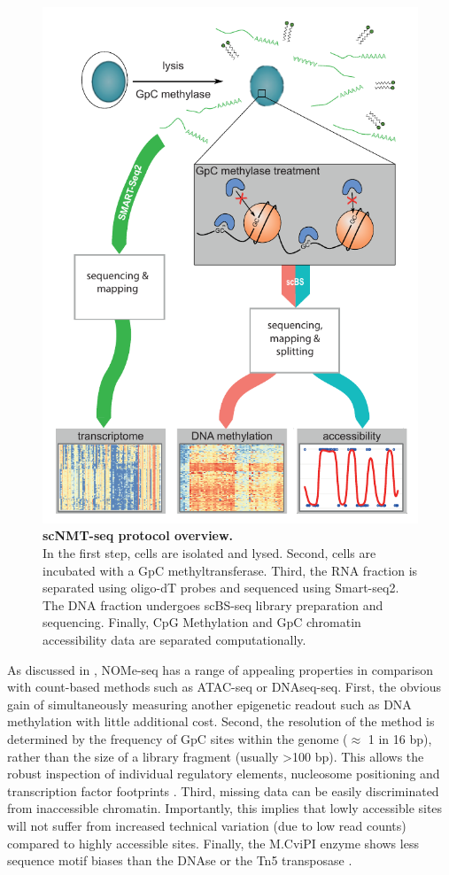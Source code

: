 \begin{figure}[H]
	\centering
	\includegraphics[width=0.55\linewidth]{scNMT_protocol}
	\caption[]{\textbf{scNMT-seq protocol overview.}\\
	In the first step, cells are isolated and lysed. Second, cells are incubated with a GpC methyltransferase. Third, the RNA fraction is separated using oligo-dT probes and sequenced using Smart-seq2. The DNA fraction undergoes scBS-seq library preparation and sequencing. Finally, CpG Methylation and GpC chromatin accessibility data are separated computationally.}
	\label{fig:scnmt_protocol}
\end{figure}

As discussed in , NOMe-seq has a range of appealing properties in comparison with count-based methods such as ATAC-seq or DNAseq-seq. First, the obvious gain of simultaneously measuring another epigenetic readout such as DNA methylation with little additional cost. Second, the resolution of the method is determined by the frequency of GpC sites within the genome ($\approx$ 1 in 16 bp), rather than the size of a library fragment (usually >100 bp). This allows the robust inspection of individual regulatory elements, nucleosome positioning and transcription factor footprints \cite{Kelly2012,Pott2016,Nordstrom2019}. Third, missing data can be easily discriminated from inaccessible chromatin. Importantly, this implies that lowly accessible sites will not suffer from increased technical variation (due to low read counts) compared to highly accessible sites. Finally, the M.CviPI enzyme shows less sequence motif biases than the DNAse or the Tn5 transposase \cite{Nordstrom2019}.

